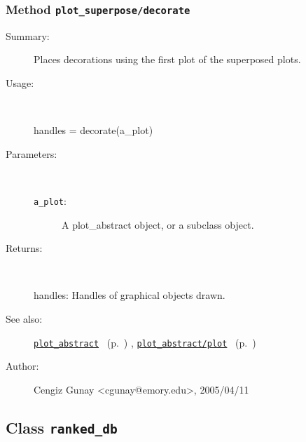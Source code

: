 \subsubsection[Method \texttt{decorate}]{Method \texttt{plot\_superpose/decorate}}%
%
\label{ref_plot_superpose__decorate}%
\hypertarget{ref_plot_superpose__decorate}{}%
\begin{description}
\item[Summary:]Places decorations using the first plot of the superposed plots.
%
\item[Usage:]~%
\begin{lyxcode}%
handles = decorate(a\_plot)
%
\end{lyxcode}%
%
%
\item[Parameters:]~
\begin{description}%
\item[\texttt{a\_plot}:]
 A plot\_abstract object, or a subclass object.
\end{description}%
%
\item[Returns:]~

	handles: Handles of graphical objects drawn.
%
%
\item[See also:]%
\hyperlink{ref_plot_abstract}{\texttt{plot\_abstract}}%
\ (p.~\pageref{ref_plot_abstract})%
%
, \hyperlink{ref_plot_abstract__plot}{\texttt{plot\_abstract/plot}}%
\ (p.~\pageref{ref_plot_abstract__plot})%
%
%
\item[Author:]%
Cengiz Gunay <cgunay@emory.edu>, 2005/04/11%
\end{description}
\methodline%
\subsection{Class \texttt{ranked\_db}}%
%
\label{ref_ranked_db}%
\hypertarget{ref_ranked_db}{}%

